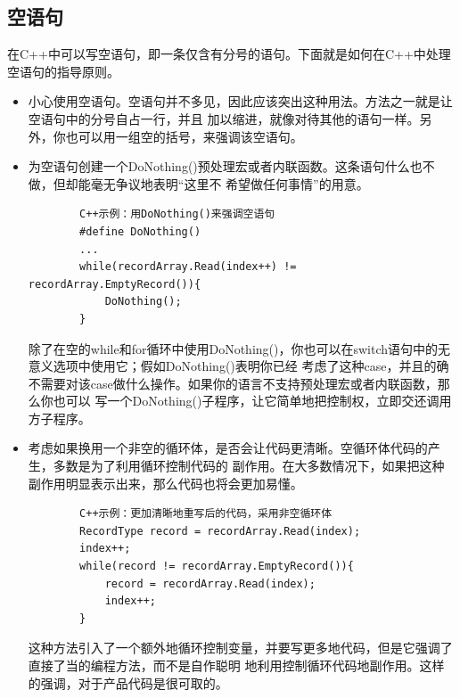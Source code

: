 \documentclass{article}
\begin{document}
\subsection{空语句}
在C++中可以写空语句，即一条仅含有分号的语句。下面就是如何在C++中处理空语句的指导原则。
\begin{itemize}
    \item 小心使用空语句。空语句并不多见，因此应该突出这种用法。方法之一就是让空语句中的分号自占一行，并且
    加以缩进，就像对待其他的语句一样。另外，你也可以用一组空的括号，来强调该空语句。
    \item 为空语句创建一个DoNothing()预处理宏或者内联函数。这条语句什么也不做，但却能毫无争议地表明“这里不
    希望做任何事情”的用意。
    \begin{lstlisting}
        C++示例：用DoNothing()来强调空语句
        #define DoNothing()
        ...
        while(recordArray.Read(index++) != recordArray.EmptyRecord()){
            DoNothing();
        }
    \end{lstlisting}
    除了在空的while和for循环中使用DoNothing()，你也可以在switch语句中的无意义选项中使用它；假如DoNothing()表明你已经
    考虑了这种case，并且的确不需要对该case做什么操作。如果你的语言不支持预处理宏或者内联函数，那么你也可以
    写一个DoNothing()子程序，让它简单地把控制权，立即交还调用方子程序。
    \item 考虑如果换用一个非空的循环体，是否会让代码更清晰。空循环体代码的产生，多数是为了利用循环控制代码的
    副作用。在大多数情况下，如果把这种副作用明显表示出来，那么代码也将会更加易懂。
    \begin{lstlisting}
        C++示例：更加清晰地重写后的代码，采用非空循环体
        RecordType record = recordArray.Read(index);
        index++;
        while(record != recordArray.EmptyRecord()){
            record = recordArray.Read(index);
            index++;
        }
    \end{lstlisting}
    这种方法引入了一个额外地循环控制变量，并要写更多地代码，但是它强调了直接了当的编程方法，而不是自作聪明
    地利用控制循环代码地副作用。这样的强调，对于产品代码是很可取的。
\end{itemize}
\end{document}
